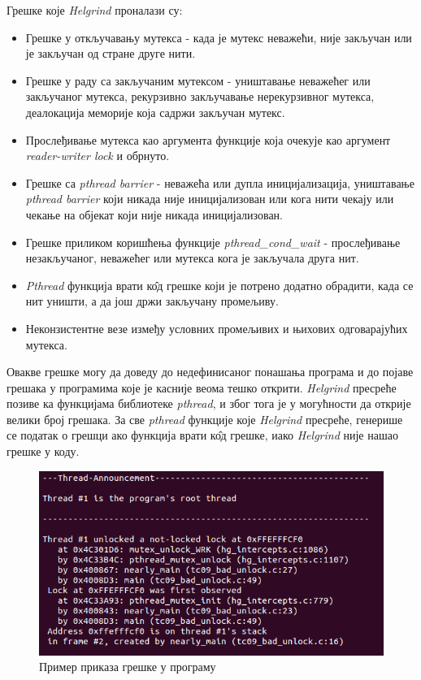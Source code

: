 \documentclass[12pt,oneside]{memoir}
\begin{document}
Грешке које \textit{Helgrind} проналази су:
\begin{itemize}
	\item Грешке у откључавању мутекса - када је мутекс неважећи, није закључан или је закључан од стране друге нити.
	\item Грешке у раду са закључаним мутексом - уништавање неважећег или закључаног мутекса, рекурзивно закључавање нерекурзивног мутекса, деалокација меморије која садржи закључан мутекс.
	\item Прослеђивање мутекса као аргумента функције која очекује као аргумент  \textit{reader-writer lock} и обрнуто.
	\item Грешке са \textit{pthread barrier} - неважећа или дупла иницијализација,  уништавање \textit{pthread barrier} који никада није иницијализован или кога нити чекају или чекање на објекат који није никада иницијализован.
	\item Грешке приликом коришћења функције \textit{pthread\_cond\_wait} - прослеђивање незакључаног, неважећег или мутекса кога је закључала друга нит.
	\item \textit{Pthread} функција врати к\^{о}д грешке који је потрено додатно обрадити, када се нит уништи, а да још држи закључану промељиву.
	\item Неконзистентне везе између условних промељивих и њихових одговарајућих мутекса. 
\end{itemize}

\indent Овакве грешке могу да доведу до недефинисаног понашања програма и до појаве грешака у програмима које је касније веома тешко открити. \textit{Helgrind} пресреће позиве ка функцијама библиотеке \textit{pthread}, и због тога је у могућности да открије велики број грешака. За све \textit{pthread} функције које \textit{Helgrind} пресреће, генерише се податак о грешци ако функција врати к\^{о}д грешке, иако \textit{Helgrind} није нашао грешке у коду.

\begin{figure}[h!]
\begin{center}
\includegraphics[scale=0.75]{slika13.png}
\end{center}
\caption{Пример приказа грешке у програму}
\label{fig:helgrind}
\end{figure}
\end{document}
